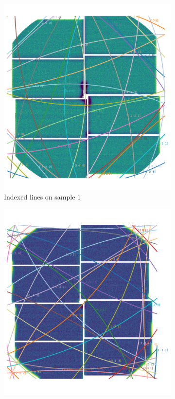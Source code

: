 \begin{figure}
	\centering
	\begin{subfigure}{0.35\textwidth}
		\includegraphics[width=\linewidth]{images/kossel_gaas1r.pdf}
		\caption{Indexed lines on sample 1}
	\end{subfigure}
	\hspace{0.2cm}
	\begin{subfigure}{0.35\textwidth}
		\includegraphics[width=\linewidth]{images/kossel_gaas2r.pdf}

\end{subfigure}
\end{figure}
